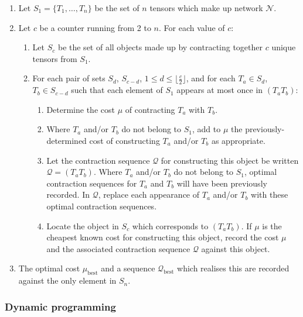 \documentclass[aps,pre,reprint,superscriptaddress,amsfonts,amsmath,showpacs,nofootinbib,floatfix]{revtex4-1}
\newcommand{\mrm}[1]{\mathrm{#1}}
\newcommand{\mc}[1]{\mathcal{#1}}
\newcommand{\fuse}[2]{(#1#2)} %
\begin{document}
\begin{enumerate}
\item Let $S_1=\{T_1,\ldots,T_n\}$ be the set of $n$ tensors which make up network $\mc{N}$.
\item Let $c$ be a counter running from 2 to $n$. For each value of $c$:
\begin{enumerate}
\item Let $S_c$ be the set of all objects made up by contracting together $c$ unique tensors from $S_1$.
\item For each pair of sets $S_d$, $S_{c-d}$, $1\leq d\leq \lfloor \frac{c}{2}\rfloor$, and for each $T_a\in S_d$, $T_b\in S_{c-d}$ such that each element of $S_1$ appears at most once in $\fuse{T_a}{T_b}$: 
\begin{enumerate}
\item Determine the cost $\mu$ of contracting $T_a$ with $T_b$.
\item Where $T_a$ and/or $T_b$ do not belong to $S_1$, add to $\mu$ the previously-determined cost of constructing $T_a$ and/or $T_b$ as appropriate.
\item Let the contraction sequence $\mc{Q}$ for constructing this object be written $\mc{Q}=\fuse{T_a}{T_b}$. Where $T_a$ and/or $T_b$ do not belong to $S_1$, optimal contraction sequences for $T_a$ and $T_b$ will have been previously recorded. In $\mc{Q}$, replace each appearance of $T_a$ and/or $T_b$ with these optimal contraction sequences.
\item Locate the object in $S_c$ which corresponds to $\fuse{T_a}{T_b}$. If $\mu$ is the cheapest known cost for constructing this object, record the cost $\mu$ and the associated contraction sequence $\mc{Q}$ against this object.
\end{enumerate}
\end{enumerate}
\item The optimal cost $\mu_\mrm{best}$ and a sequence $\mc{Q}_\mrm{best}$ which realises this are recorded against the only element in $S_n$.
\end{enumerate}



\subsubsection{Dynamic programming\label{sec:DPalg}}
\end{document}

